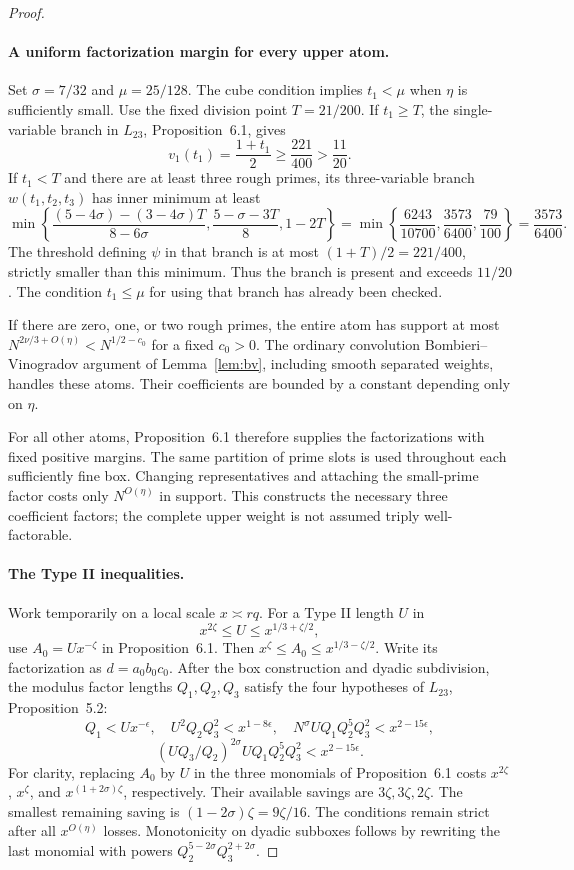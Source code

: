 \documentclass[11pt]{article}
\begin{document}
\begin{proof}
\paragraph{A uniform factorization margin for every upper atom.}
Set $\sigma=7/32$ and $\mu=25/128$. The cube condition implies
$t_1<\mu$ when $\eta$ is sufficiently small.
Use the fixed division point $T=21/200$.
If $t_1\ge T$, the single-variable branch in $L_{23}$,
Proposition~6.1, gives
\[
 v_1(t_1)=\frac{1+t_1}{2}\ge\frac{221}{400}>\frac{11}{20}.
\]
If $t_1<T$ and there are at least three rough primes, its
three-variable branch $w(t_1,t_2,t_3)$ has inner minimum at least
\[
 \min\left\{
   \frac{(5-4\sigma)-(3-4\sigma)T}{8-6\sigma},
   \frac{5-\sigma-3T}{8},1-2T\right\}
 =
 \min\left\{\frac{6243}{10700},\frac{3573}{6400},
                  \frac{79}{100}\right\}
 =\frac{3573}{6400}.
\]
The threshold defining $\psi$ in that branch is at most
$(1+T)/2=221/400$, strictly smaller than this minimum.
Thus the branch is present and exceeds $11/20$.
The condition $t_1\le\mu$ for using that branch has already
been checked.

If there are zero, one, or two rough primes, the entire atom has
support at most $N^{2\nu/3+O(\eta)}<N^{1/2-c_0}$ for a fixed
$c_0>0$. The ordinary convolution Bombieri--Vinogradov argument
of Lemma~\ref{lem:bv}, including smooth separated weights,
handles these atoms. Their coefficients are bounded by a constant
depending only on $\eta$.

For all other atoms, Proposition~6.1 therefore supplies the
factorizations with fixed positive margins. The same partition
of prime slots is used throughout each sufficiently fine box.
Changing representatives and attaching the small-prime factor
costs only $N^{O(\eta)}$ in support.
This constructs the necessary three coefficient factors;
the complete upper weight is not assumed triply well-factorable.

\paragraph{The Type II inequalities.}
Work temporarily on a local scale $x\asymp rq$.
For a Type II length $U$ in
\[
 x^{2\zeta}\le U\le x^{1/3+\zeta/2},
\]
use $A_0=Ux^{-\zeta}$ in Proposition~6.1.
Then $x^\zeta\le A_0\le x^{1/3-\zeta/2}$.
Write its factorization as $d=a_0b_0c_0$.
After the box construction and dyadic subdivision, the modulus
factor lengths $Q_1,Q_2,Q_3$ satisfy the four hypotheses of
$L_{23}$, Proposition~5.2:
\[
 Q_1<Ux^{-\epsilon},\quad
 U^2Q_2Q_3^2<x^{1-8\epsilon},\quad
 N^\sigma UQ_1Q_2^5Q_3^2<x^{2-15\epsilon},
\]
\[
 (UQ_3/Q_2)^{2\sigma}UQ_1Q_2^5Q_3^2<x^{2-15\epsilon}.
\]
For clarity, replacing $A_0$ by $U$ in the three monomials
of Proposition~6.1 costs $x^{2\zeta}$, $x^\zeta$,
and $x^{(1+2\sigma)\zeta}$, respectively. Their available
savings are $3\zeta,3\zeta,2\zeta$.
The smallest remaining saving is $(1-2\sigma)\zeta=9\zeta/16$.
The conditions remain strict after all $x^{O(\eta)}$ losses.
Monotonicity on dyadic subboxes follows by rewriting the last
monomial with powers $Q_2^{5-2\sigma}Q_3^{2+2\sigma}$.


\end{proof}
\end{document}
